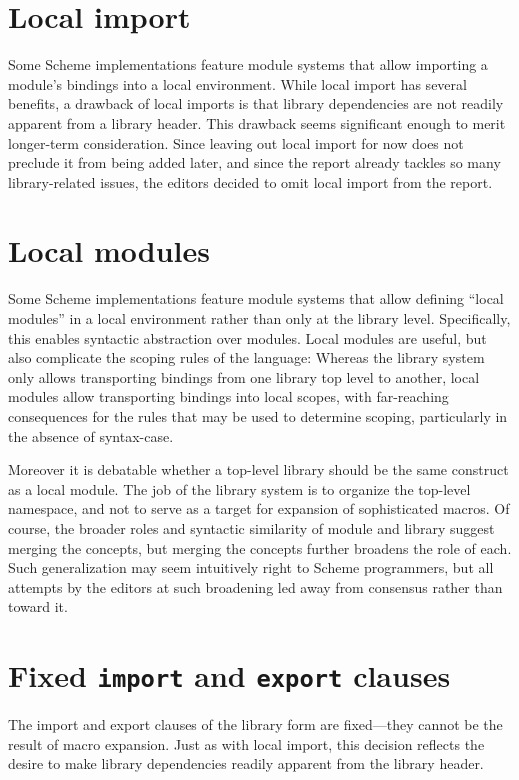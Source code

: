 \documentclass[twoside,twocolumn]{algol60}
\begin{document}
\section{Local import}

Some Scheme implementations feature module systems that allow
importing a module's bindings into a local environment.  While local
import has several benefits, a drawback of local
imports is that library dependencies are not readily apparent from a
library header. This drawback seems significant enough to merit
longer-term consideration. Since leaving out local import for now does
not preclude it from being added later, and since the report already
tackles so many library-related issues, the editors decided to omit
local import from the report.

\section{Local modules}

Some Scheme implementations feature module systems that allow defining
``local modules'' in a local environment rather than only at the
library level.  Specifically, this enables syntactic abstraction over
modules.  Local modules are useful, but also complicate
the scoping rules of the language: Whereas the library system only
allows transporting bindings from one library top level to another,
local modules allow transporting bindings into local scopes, with
far-reaching consequences for the rules that may be used to determine
scoping, particularly in the absence of {\cf syntax-case}.

Moreover it is debatable whether a top-level library should
be the same construct as a local module. The job of the library
system is to organize the top-level namespace, and not to serve as a
target for expansion of sophisticated macros. Of course, the broader
roles and syntactic similarity of {\cf module} and {\cf library}
suggest merging the concepts, but merging the concepts further
broadens the role of each.  Such generalization may seem intuitively
right to Scheme programmers, but all attempts by the editors at such
broadening led away from consensus rather than toward it.

\section{Fixed {\tt import} and {\tt export} clauses}

The {\cf import} and {\cf export} clauses of the {\cf library} form
are fixed---they cannot be the result of macro expansion.  Just as
with local import, this decision reflects the desire to make library
dependencies readily apparent from the library header.
\end{document}
